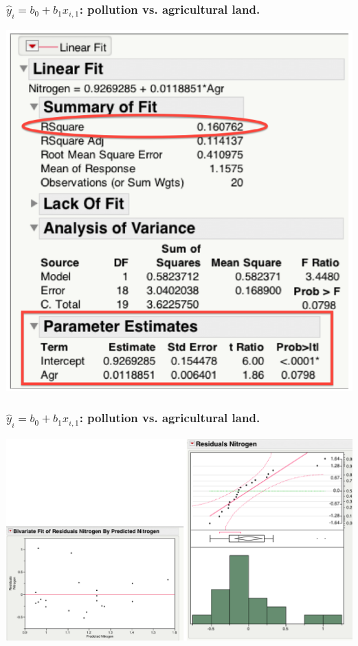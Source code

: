 \documentclass[handout]{beamer}\usepackage{graphicx, color}
\providecommand{\wh}[1]{\widehat{#1}}
\numberwithin{equation}{section}
\begin{document}
\begin{frame}
\frametitle{$\wh{y}_i = b_0 + b_1 x_{i, 1} $: pollution vs. agricultural land.}
\begin{center}
 \includegraphics{../../fig/riversmodel1output.png}
\end{center}
\end{frame}


\begin{frame}
\frametitle{$\wh{y}_i = b_0 + b_1 x_{i, 1} $: pollution vs. agricultural land.}
\begin{center}
 \includegraphics{../../fig/riversmodel1diagnostics.png}
\end{center}
\end{frame}
\end{document}
